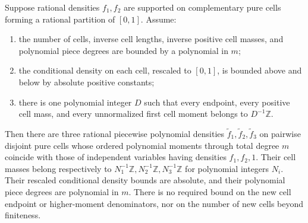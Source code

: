 \documentclass[11pt]{article}
\begin{document}
\begin{lemma}\label{insert}
Suppose rational densities $f_1,f_2$ are supported on complementary
pure cells forming a rational partition of $[0,1]$. Assume:
\begin{enumerate}
\item the number of cells, inverse cell lengths, inverse positive cell
masses, and polynomial piece degrees are bounded by a polynomial in $m$;
\item the conditional density on each cell, rescaled to $[0,1]$, is
bounded above and below by absolute positive constants;
\item there is one polynomial integer $D$ such that every endpoint,
every positive cell mass, and every unnormalized first cell moment
belongs to $D^{-1}\mathbb Z$.
\end{enumerate}
Then there are three rational piecewise polynomial densities
$\widetilde f_1,\widetilde f_2,\widetilde f_3$ on pairwise disjoint
pure cells whose ordered polynomial moments through total degree $m$
coincide with those of independent variables having densities
$f_1,f_2,1$. Their cell masses belong respectively to
$N_1^{-1}\mathbb Z,N_2^{-1}\mathbb Z,N_3^{-1}\mathbb Z$ for
polynomial integers $N_i$. Their rescaled conditional density bounds
are absolute, and their polynomial piece degrees are polynomial in $m$.
There is no required bound on the new cell endpoint or higher-moment
denominators, nor on the number of new cells beyond finiteness.
\end{lemma}
\end{document}
